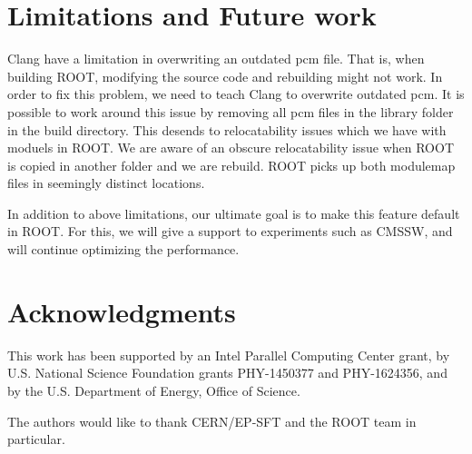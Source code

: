\documentclass{webofc}
\begin{document}
\section{Limitations and Future work}
\label{limitationsandfuture}

Clang have a limitation in overwriting an outdated pcm file. That is, when building ROOT, modifying the source code and rebuilding might not work. In order to fix this problem, we need to teach Clang to overwrite outdated pcm. It is possible to work around this issue by removing all pcm files in the library folder in the build directory. This desends to relocatability issues which we have with moduels in ROOT. We are aware of an obscure relocatability issue when ROOT is copied in another folder and we are rebuild. ROOT picks up both modulemap files in seemingly distinct locations.


In addition to above limitations, our ultimate goal is to make this feature default in ROOT. For this, we will give a support to experiments such as CMSSW, and will continue optimizing the performance.

\section{Acknowledgments}

This work has been supported by an Intel Parallel Computing Center grant, by U.S. National Science Foundation grants PHY-1450377 and PHY-1624356, and by the U.S. Department of Energy, Office of Science.

The authors would like to thank CERN/EP-SFT and the ROOT team in particular.
\end{document}
